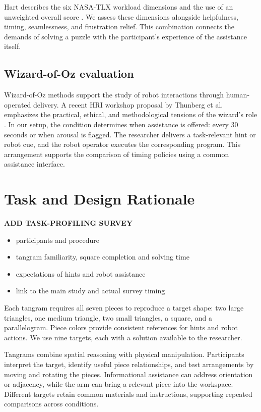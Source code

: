 \documentclass[sigconf]{aamas}
\begin{document}
Hart describes the six NASA-TLX workload dimensions and the use of an unweighted overall score \cite{hart2006}. We assess these dimensions alongside helpfulness, timing, seamlessness, and frustration relief. This combination connects the demands of solving a puzzle with the participant's experience of the assistance itself.

\subsection{Wizard-of-Oz evaluation}

Wizard-of-Oz methods support the study of robot interactions through human-operated delivery. A recent HRI workshop proposal by Thunberg et al. emphasizes the practical, ethical, and methodological tensions of the wizard's role \cite{thunberg2026}. In our setup, the condition determines when assistance is offered: every 30 seconds or when arousal is flagged. The researcher delivers a task-relevant hint or robot cue, and the robot operator executes the corresponding program. This arrangement supports the comparison of timing policies using a common assistance interface.

\section{Task and Design Rationale}

\textbf{ADD TASK-PROFILING SURVEY}
\begin{itemize}
\item participants and procedure
\item tangram familiarity, square completion and solving time
\item expectations of hints and robot assistance
\item link to the main study and actual survey timing
\end{itemize}

Each tangram requires all seven pieces to reproduce a target shape: two large triangles, one medium triangle, two small triangles, a square, and a parallelogram. Piece colors provide consistent references for hints and robot actions. We use nine targets, each with a solution available to the researcher.

Tangrams combine spatial reasoning with physical manipulation. Participants interpret the target, identify useful piece relationships, and test arrangements by moving and rotating the pieces. Informational assistance can address orientation or adjacency, while the arm can bring a relevant piece into the workspace. Different targets retain common materials and instructions, supporting repeated comparisons across conditions.
\end{document}

